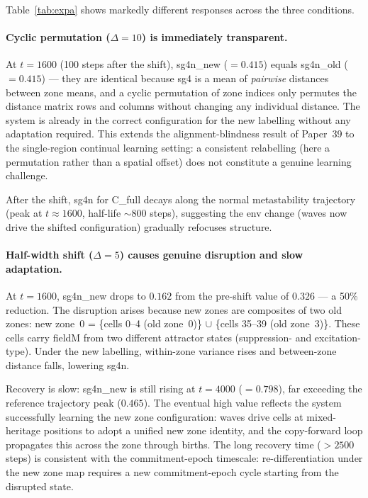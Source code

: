 \documentclass[11pt]{article}
\begin{document}
Table~\ref{tab:expa} shows markedly different responses across the three conditions.

\paragraph{Cyclic permutation ($\Delta=10$) is immediately transparent.}
At $t=1600$ (100 steps after the shift), sg4n\_new ($=0.415$) equals sg4n\_old ($=0.415$)
--- they are identical because sg4 is a mean of \emph{pairwise} distances between zone
means, and a cyclic permutation of zone indices only permutes the distance matrix rows and
columns without changing any individual distance.
The system is already in the correct configuration for the new labelling without any
adaptation required.
This extends the alignment-blindness result of Paper~39 to the single-region continual
learning setting: a consistent relabelling (here a permutation rather than a spatial
offset) does not constitute a genuine learning challenge.

After the shift, sg4n for C\_full decays along the normal metastability trajectory
(peak at $t\approx1600$, half-life $\sim800$ steps), suggesting the env change
(waves now drive the shifted configuration) gradually refocuses structure.

\paragraph{Half-width shift ($\Delta=5$) causes genuine disruption and slow adaptation.}
At $t=1600$, sg4n\_new drops to $0.162$ from the pre-shift value of $0.326$ --- a 50\%
reduction.
The disruption arises because new zones are composites of two old zones:
new zone~0 = \{cells 0--4 (old zone~0)\} $\cup$ \{cells 35--39 (old zone~3)\}.
These cells carry fieldM from two different attractor states (suppression- and
excitation-type).
Under the new labelling, within-zone variance rises and between-zone distance falls,
lowering sg4n.

Recovery is slow: sg4n\_new is still rising at $t=4000$ ($=0.798$), far exceeding the
reference trajectory peak ($0.465$).
The eventual high value reflects the system successfully learning the new zone
configuration: waves drive cells at mixed-heritage positions to adopt a unified new zone
identity, and the copy-forward loop propagates this across the zone through births.
The long recovery time ($>2500$ steps) is consistent with the commitment-epoch timescale:
re-differentiation under the new zone map requires a new commitment-epoch cycle starting
from the disrupted state.
\end{document}

